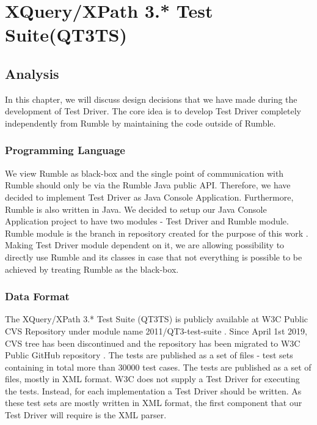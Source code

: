 \chapter{XQuery/XPath 3.* Test Suite(QT3TS)}
\section{Analysis}
In this chapter, we will discuss design decisions that we have made during the development of Test Driver. The core idea is to develop Test Driver completely independently from Rumble by maintaining the code outside of Rumble.

\subsection{Programming Language}
 We view Rumble as black-box and the single point of communication with Rumble should only be via the Rumble Java public API. Therefore, we have decided to implement Test Driver as Java Console Application. Furthermore, Rumble is also written in Java. We decided to setup our Java Console Application project to have two modules - Test Driver and Rumble module. Rumble module is the branch in repository created for the purpose of this work \cite{RumbleBranch}. Making Test Driver module dependent on it, we are allowing possibility to directly use Rumble and its classes in case that not everything is possible to be achieved by treating Rumble as the black-box. 

\subsection{Data Format}
The XQuery/XPath 3.* Test Suite (QT3TS) is publicly available at W3C Public CVS Repository under module name 2011/QT3-test-suite \cite{TestSuiteCVSRepository}. Since April 1st 2019, CVS tree has been discontinued and the repository has been migrated to W3C Public GitHub repository \cite{TestSuiteGitHubRepository}. The tests are published as a set of files - test sets containing in total more than 30000 test cases. The tests are published as a set of files, mostly in XML format. W3C does not supply a Test Driver for executing the tests. Instead, for each implementation a Test Driver should be written. As these test sets are mostly written in XML format, the first component that our Test Driver will require is the XML parser. 

